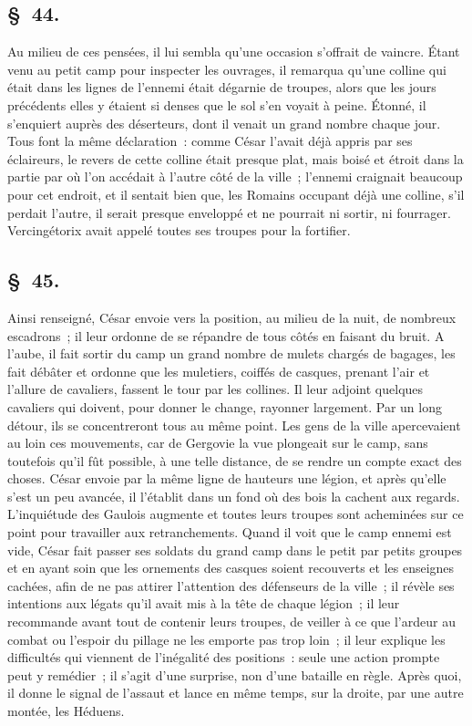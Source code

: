 \documentclass[french,twoside]{book} %
\begin{document}
\subsection[{§ 44.}]{ \textsc{§ 44.} }
\noindent Au milieu de ces pensées, il lui sembla qu’une occasion s’offrait de vaincre. Étant venu au petit camp pour inspecter les ouvrages, il remarqua qu’une colline qui était dans les lignes de l’ennemi était dégarnie de troupes, alors que les jours précédents elles y étaient si denses que le sol s’en voyait à peine. Étonné, il s’enquiert auprès des déserteurs, dont il venait un grand nombre chaque jour. Tous font la même déclaration : comme César l’avait déjà appris par ses éclaireurs, le revers de cette colline était presque plat, mais boisé et étroit dans la partie par où l’on accédait à l’autre côté de la ville ; l’ennemi craignait beaucoup pour cet endroit, et il sentait bien que, les Romains occupant déjà une colline, s’il perdait l’autre, il serait presque enveloppé et ne pourrait ni sortir, ni fourrager. Vercingétorix avait appelé toutes ses troupes pour la fortifier.
\subsection[{§ 45.}]{ \textsc{§ 45.} }
\noindent Ainsi renseigné, César envoie vers la position, au milieu de la nuit, de nombreux escadrons ; il leur ordonne de se répandre de tous côtés en faisant du bruit. A l’aube, il fait sortir du camp un grand nombre de mulets chargés de bagages, les fait débâter et ordonne que les muletiers, coiffés de casques, prenant l’air et l’allure de cavaliers, fassent le tour par les collines. Il leur adjoint quelques cavaliers qui doivent, pour donner le change, rayonner largement. Par un long détour, ils se concentreront tous au même point. Les gens de la ville apercevaient au loin ces mouvements, car de Gergovie la vue plongeait sur le camp, sans toutefois qu’il fût possible, à une telle distance, de se rendre un compte exact des choses. César envoie par la même ligne de hauteurs une légion, et après qu’elle s’est un peu avancée, il l’établit dans un fond où des bois la cachent aux regards. L'inquiétude des Gaulois augmente et toutes leurs troupes sont acheminées sur ce point pour travailler aux retranchements. Quand il voit que le camp ennemi est vide, César fait passer ses soldats du grand camp dans le petit par petits groupes et en ayant soin que les ornements des casques soient recouverts et les enseignes cachées, afin de ne pas attirer l’attention des défenseurs de la ville ; il révèle ses intentions aux légats qu’il avait mis à la tête de chaque légion ; il leur recommande avant tout de contenir leurs troupes, de veiller à ce que l’ardeur au combat ou l’espoir du pillage ne les emporte pas trop loin ; il leur explique les difficultés qui viennent de l’inégalité des positions : seule une action prompte peut y remédier ; il s’agit d’une surprise, non d’une bataille en règle. Après quoi, il donne le signal de l’assaut et lance en même temps, sur la droite, par une autre montée, les Héduens.
\end{document}
